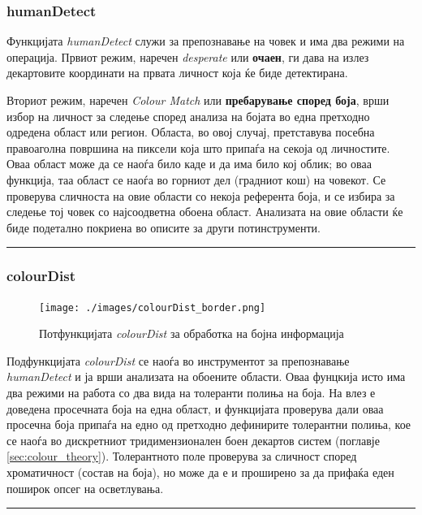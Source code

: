 \documentclass[11pt]{article}
\begin{document}
    \subsubsection{humanDetect}
      Функцијата \textit{humanDetect} служи за препознавање на човек и има два режими на операција. Првиот режим, наречен \textit{desperate} или \textbf{очаен}, ги дава на излез декартовите координати на првата личност која ќе биде детектирана.

      Вториот режим, наречен \textit{Colour Match} или \textbf{пребарување според боја}, врши избор на личност за следење според анализа на бојата во една претходно одредена област или регион. Областа, во овој случај, претставува посебна правоаголна површина на пиксели која што припаѓа на секоја од личностите. Оваа област може да се наоѓа било каде и да има било кој облик; во оваа функција, таа област се наоѓа во горниот дел (градниот кош) на човекот. Се проверува сличноста на овие области со некоја референта боја, и се избира за следење тој човек со најсоодветна обоена област. Анализата на овие области ќе биде подетално покриена во описите за други потинструменти.\\
      \textcolor[RGB]{150,150,150}{\rule{\linewidth}{1.6pt}}

    \subsubsection{colourDist} \label{sec:colourDist}
	    \begin{figure}[H]
        \centering
	      \texttt{[image: ./images/colourDist\_border.png]}
		    \caption{Потфункцијата \textit{colourDist} за обработка на бојна информација}
	      \label{fig:colourDist.png}
	      \end{figure}
      Подфункцијата \textit{colourDist} се наоѓа во инструментот за препознавање \textit{humanDetect} и ја врши анализата на обоените области. Оваа фунцкија исто има два режими на работа со два вида на толеранти полиња на боја. На влез е доведена просечната боја на една област, и функцијата проверува дали оваа просечна боја припаѓа на едно од претходно дефинирите толерантни полиња, кое се наоѓа во дискретниот тридимензионален боен декартов систем (поглавје \ref{sec:colour_theory}). Толерантното поле проверува за сличност според хроматичност (состав на боја), но може да е и проширено за да прифаќа еден поширок опсег на осветлувања.\\
      \textcolor[RGB]{150,150,150}{\rule{\linewidth}{1.6pt}}
\end{document}
